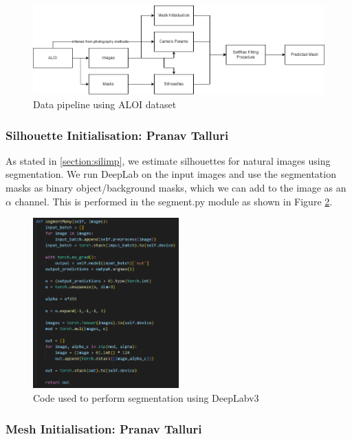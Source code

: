 \documentclass{article}
\begin{document}
\begin{figure}[h!]
  \centering
  \includegraphics[width=\textwidth]{images/aloidatapipe.png}
  \caption{Data pipeline using ALOI dataset}
  \label{aloidatapipe}
\end{figure}

\newpage
\subsubsection{Silhouette Initialisation: Pranav Talluri}

As stated in \ref{section:silimp}, we estimate silhouettes for natural images using segmentation. We run DeepLab on the input images and use the segmentation masks as binary object/background masks, which we can add to the image as an $\alpha$ channel. This is performed in the segment.py module as shown in Figure \ref{segment}. 

\begin{figure}[h!]
  \centering
  \includegraphics[width=0.5\textwidth]{images/segmentcode.png}
  \caption{Code used to perform segmentation using DeepLabv3}
  \label{segment}
\end{figure}

\newpage
\subsubsection{Mesh Initialisation: Pranav Talluri}
\label{section:meshinitcode}
\end{document}

